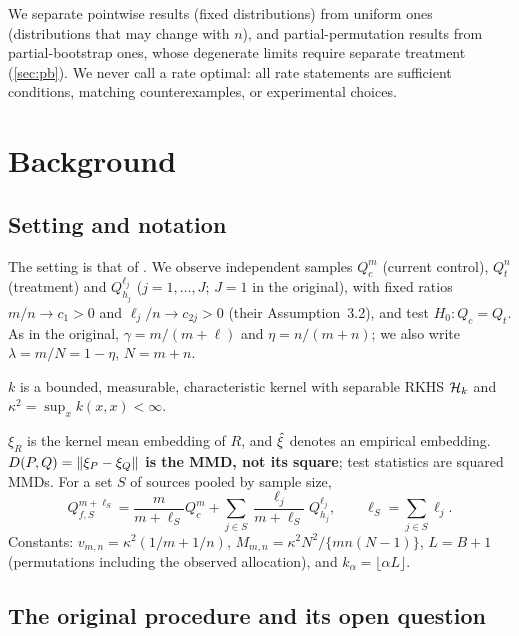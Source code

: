 \documentclass[11pt,a4paper]{article}
\begin{document}
We separate pointwise results (fixed distributions) from uniform ones (distributions that may change with $n$), and partial-permutation results from partial-bootstrap ones, whose degenerate limits require separate treatment (\cref{sec:pb}). We never call a rate optimal: all rate statements are sufficient conditions, matching counterexamples, or experimental choices.

\section{Background}\label{sec:background}

\subsection{Setting and notation}\label{sec:setting}

The setting is that of \citet{yang2026}. We observe independent samples $Q_c^m$ (current control), $Q_t^n$ (treatment) and $Q_{h_j}^{\ell_j}$ ($j=1,\dots,J$; $J=1$ in the original), with fixed ratios $m/n\to c_1>0$ and $\ell_j/n\to c_{2j}>0$ (their Assumption~3.2), and test $H_0:Q_c=Q_t$. As in the original, $\gamma=m/(m+\ell)$ and $\eta=n/(m+n)$; we also write $\lambda=m/N=1-\eta$, $N=m+n$.

\begin{assumption}[Kernel]\label{ass:kernel}
$k$ is a bounded, measurable, characteristic kernel with separable RKHS $\mathcal{H}_k$ and $\kappa^2=\sup_xk(x,x)<\infty$.
\end{assumption}

$\xi_R$ is the kernel mean embedding of $R$, and $\hat\xi$ denotes an empirical embedding. \textbf{$D(P,Q)=\lVert \xi_P-\xi_Q\rVert$ is the MMD, not its square}; test statistics are squared MMDs. For a set $S$ of sources pooled by sample size,
\[
Q_{f,S}^{m+\ell_S}=\frac{m}{m+\ell_S}Q_c^m+\sum_{j\in S}\frac{\ell_j}{m+\ell_S}Q_{h_j}^{\ell_j},\qquad \ell_S=\sum_{j\in S}\ell_j .
\]
Constants: $v_{m,n}=\kappa^2(1/m+1/n)$, $M_{m,n}=\kappa^2N^2/\{mn(N-1)\}$, $L=B+1$ (permutations including the observed allocation), and $k_\alpha=\lfloor\alpha L\rfloor$.

\subsection{The original procedure and its open question}\label{sec:orig}
\end{document}
